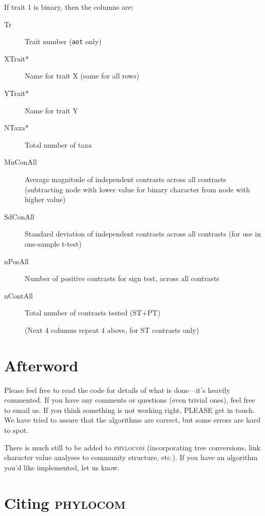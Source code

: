 \documentclass[12pt,letterpaper]{article}
\begin{document}
\noindent If trait 1 is binary, then the columns are:

\begin{description}	
\item[\hspace{1em} Tr] Trait number (\verb|aot| only)
\item[\hspace{1em} XTrait*] Name for trait X (same for all rows)
\item[\hspace{1em} YTrait*] Name for trait Y
\item[\hspace{1em} NTaxa*] Total number of taxa
\item[\hspace{1em} MnConAll] Average magnitude of independent
  contrasts across all contrasts (subtracting node with lower value
  for binary character from node with higher value)
\item[\hspace{1em} SdConAll] Standard deviation of independent
  contrasts across all contrasts (for use in one-sample t-test)
\item[\hspace{1em} nPosAll] Number of positive contrasts for sign
  test, across all contrasts
\item[\hspace{1em} nContAll] Total number of contrasts tested (ST+PT)
\item[\hspace{1em} ] (Next 4 columns repeat 4 above, for ST contrasts only)
\end{description}


\section{Afterword}

Please feel free to read the code for details of what is done---it's
heavily commented. If you have any comments or questions (even trivial
ones), feel free to email us. If you think something is not working
right, PLEASE get in touch. We have tried to assure that the
algorithms are correct, but some errors are hard to spot.

There is much still to be added to {\scshape phylocom} (incorporating
tree conversions, link character value analyses to community
structure, etc.). If you have an algorithm you'd like implemented, let
us know.

\section{Citing {\scshape phylocom}}
\end{document}
